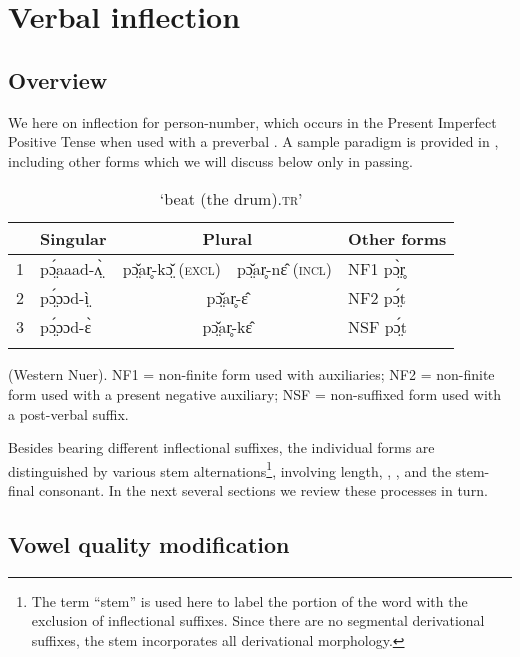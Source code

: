 \documentclass[output=paper,newtxmath,modfonts,nonflat,draftmode]{langsci/langscibook}
\begin{document}
\section{Verbal inflection}
\subsection{Overview} %

We  here on inflection for  person-number, which occurs in the Present Imperfect Positive Tense when used with a preverbal . A sample paradigm is provided in , including other forms which we will discuss below only in passing.

\begin{table}
\caption{‘beat (the drum)\textsc{.tr}’}
\label{tab:monich:3}
\begin{tabularx}{\textwidth}{llrll}
\lsptoprule
 & \bfseries Singular & \multicolumn{2}{c}{\bfseries Plural} & \bfseries Other forms\\
\midrule
1  & pɔ̤́aaad-ʌ̤̀ & \multicolumn{1}{r}{pɔ̤̌ar̥-kɔ̤̌ (\textsc{excl})} & \multicolumn{1}{l}{pɔ̤̌ar̥-nɛ̂ (\textsc{incl})} & NF1 pɔ̤̀r̥\\
2 & pɔ̤́ɔɔd-ì̤ & \multicolumn{2}{c}{pɔ̤̌ar̥-ɛ̂} & NF2 pɔ̤́t\\
3 & pɔ̤́ɔɔd-ɛ̀ & \multicolumn{2}{c}{pɔ̤̌ar̥-kɛ̂} & NSF pɔ̤́t\\
\lspbottomrule
\end{tabularx}
\parbox{\textwidth}{\small\raggedright(Western Nuer).
NF1 = non-finite form used with  auxiliaries;
NF2 = non-finite form used with a present negative auxiliary;
NSF = non-suffixed form used with a post-verbal suffix.
}
\end{table}


Besides bearing different inflectional suffixes, the individual forms are distinguished by various stem alternations\footnote{The\label{fn:monich:3} term “stem” is used here to label the portion of the word with the exclusion of inflectional suffixes. Since there are no segmental derivational suffixes, the stem incorporates all derivational morphology.}, involving length, , , and the stem-final consonant. In the next several sections we review these processes in turn. 

\subsection{Vowel quality modification} %
\end{document}
